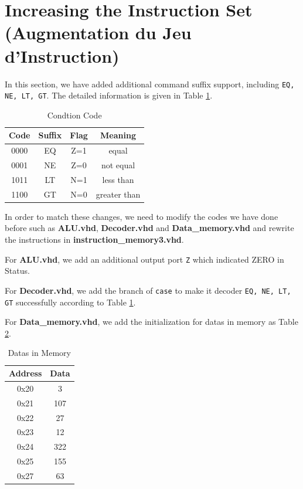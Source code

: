 \section{Increasing the Instruction Set (Augmentation du Jeu d'Instruction)}
\label{sec:Increasing the Instruction Set (Augmentation du Jeu d'Instruction)}

In this section, we have added additional command suffix support, including \texttt{EQ, NE, LT, GT}.
The detailed information is given in Table \ref{tab:Condition Code}.

\begin{table}[htbp]
    \centering
    \caption{Condtion Code}
    \label{tab:Condition Code}
    \begin{tabular}{@{}cccc@{}}
    \toprule
    \textbf{Code} & \textbf{Suffix} & \textbf{Flag} & \textbf{Meaning} \\ \midrule
    0000          & EQ              & Z=1           & equal            \\
    0001          & NE              & Z=0           & not equal        \\
    1011          & LT              & N=1           & less than        \\
    1100          & GT              & N=0           & greater than     \\ \bottomrule
    \end{tabular}
\end{table}

In order to match these changes, we need to modify the codes we have done before such as \textbf{ALU.vhd}, \textbf{Decoder.vhd} and \textbf{Data\_memory.vhd}
and rewrite the instructions in \textbf{instruction\_memory3.vhd}.

For \textbf{ALU.vhd}, we add an additional output port \texttt{Z} which indicated ZERO in Status.

For \textbf{Decoder.vhd}, we add the branch of \texttt{case} to make it decoder \texttt{EQ, NE, LT, GT} successfully
according to Table \ref{tab:Condition Code}.

For \textbf{Data\_memory.vhd}, we add the initialization for datas in memory as Table \ref{tab:datas in mem}.
\begin{table}[htbp]
    \centering
    \caption{Datas in Memory}
    \label{tab:datas in mem}
    \begin{tabular}{@{}cc@{}}
    \toprule
    \textbf{Address} & \textbf{Data} \\ \midrule
    0x20          & 3              \\
    0x21          & 107              \\
    0x22          & 27              \\
    0x23          & 12              \\
    0x24          & 322              \\
    0x25          & 155              \\
    0x27          & 63              \\ \bottomrule
    \end{tabular}
\end{table}

